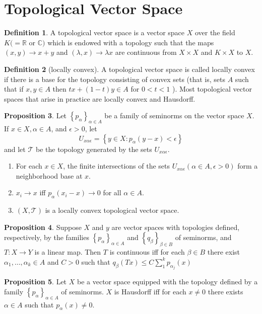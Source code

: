 \documentclass[12pt,a4paper]{book}
\newenvironment{enu}{\begin{enumerate}[(1)]}{\end{enumerate}}
\theoremstyle{definition}
\newtheorem{defn}{Definition}[section]
\newtheorem{prop}[defn]{Proposition}
\begin{document}
\section{Topological Vector Space}
\begin{defn}
    A topological vector space is a vector space $X$ over the field $K(=\mathbb{R}$ or $\mathbb{C})$ which is endowed with a topology such that the maps $(x, y) \rightarrow x+y$ and $(\lambda, x) \rightarrow \lambda x$ are continuous from $X \times X$ and $K \times X$ to $X$. 
\end{defn}   
\begin{defn}[locally convex]
    A topological vector space is called locally convex if there is a base for the topology consisting of convex sets (that is, sets $A$ such that if $x, y \in A$ then $t x+(1-t) y \in A$ for $0<t<1$ ). Most topological vector spaces that arise in practice are locally convex and Hausdorff.
\end{defn}
\begin{prop}
    Let $\left\{p_\alpha\right\}_{\alpha \in A}$ be a family of seminorms on the vector space $X$. If $x \in X, \alpha \in A$, and $\epsilon>0$, let
    $$
    U_{x \alpha \epsilon}=\left\{y \in X: p_\alpha(y-x)<\epsilon\right\}
    $$
    and let $\mathcal{T}$ be the topology generated by the sets $U_{x \alpha \epsilon}$.
    \begin{enu} 
    \item For each $x \in X$, the finite intersections of the sets $U_{x \alpha \epsilon}(\alpha \in A, \epsilon>0)$ form a neighborhood base at $x$.
    \item $x_i \rightarrow x$ iff $p_\alpha\left(x_i-x\right) \rightarrow 0$ for all $\alpha \in A$.
    \item $(X, \mathcal{T})$ is a locally convex topological vector space.
    \end{enu}
\end{prop}
\begin{prop}
Suppose $X$ and $y$ are vector spaces with topologies defined, respectively, by the families $\left\{p_\alpha\right\}_{\alpha \in A}$ and $\left\{q_\beta\right\}_{\beta \in B}$ of seminorms, and $T: X \rightarrow Y$ is a linear map. Then $T$ is continuous iff for each $\beta \in B$ there exist $\alpha_1, \ldots, \alpha_k \in A$ and $C>0$ such that $q_\beta(T x) \leq C \sum_1^k p_{\alpha_j}(x)$
\end{prop}
\begin{prop}
    Let $X$ be a vector space equipped with the topology defined by a family $\left\{p_\alpha\right\}_{\alpha \in A}$ of seminorms. $X$ is Hausdorff iff for each $x \neq 0$ there exists $\alpha \in A$ such that $p_\alpha(x) \neq 0$.
\end{prop}
\end{document}
